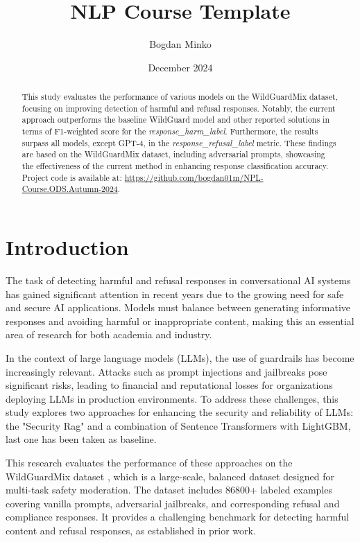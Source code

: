 \documentclass{article}
\title{NLP Course Template}
\author{Bogdan Minko}
\date{December 2024}
\begin{document}
\maketitle
\begin{abstract}
    This study evaluates the performance of various models on the WildGuardMix dataset, focusing on improving detection of harmful and refusal responses. Notably, the current approach outperforms the baseline WildGuard model and other reported solutions in terms of F1-weighted score for the \textit{response\_harm\_label}. Furthermore, the results surpass all models, except GPT-4, in the \textit{response\_refusal\_label} metric. These findings are based on the WildGuardMix dataset, including adversarial prompts, showcasing the effectiveness of the current method in enhancing response classification accuracy. Project code is available at: \url{https://github.com/bogdan01m/NPL-Course.ODS.Autumn-2024}.
\end{abstract}




\section{Introduction}
The task of detecting harmful and refusal responses in conversational AI systems has gained significant attention in recent years due to the growing need for safe and secure AI applications. Models must balance between generating informative responses and avoiding harmful or inappropriate content, making this an essential area of research for both academia and industry. 

In the context of large language models (LLMs), the use of guardrails has become increasingly relevant. Attacks such as prompt injections and jailbreaks pose significant risks, leading to financial and reputational losses for organizations deploying LLMs in production environments. To address these challenges, this study explores two approaches for enhancing the security and reliability of LLMs: the "Security Rag" and a combination of Sentence Transformers with LightGBM, last one has been taken as baseline. 

This research evaluates the performance of these approaches on the WildGuardMix dataset \cite{wildguard2024paper}, which is a large-scale, balanced dataset designed for multi-task safety moderation. The dataset includes 86800+ labeled examples covering vanilla prompts, adversarial jailbreaks, and corresponding refusal and compliance responses. It provides a challenging benchmark for detecting harmful content and refusal responses, as established in prior work. 
\end{document}
